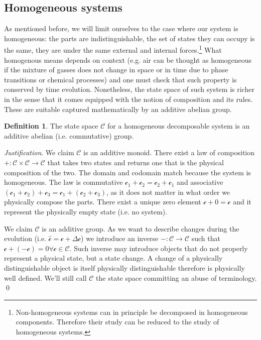 \documentclass[aps,pra,10pt,twocolumn,floatfix,nofootinbib]{revtex4-1}
\theoremstyle{definition}
\newtheorem{defn}[prop]{Definition}
\newenvironment{justification}{\emph{Justification}.}{\qed}
\begin{document}
\subsection{Homogeneous systems}
As mentioned before, we will limit ourselves to the case where our system is homogeneous: the parts are indistinguishable, the set of states they can occupy is the same, they are under the same external and internal forces.\footnote{Non-homogeneous systems can in principle be decomposed in homogeneous components. Therefore their study can be reduced to the study of homogeneous systems.} What homogenous means depends on context (e.g. air can be thought as homogeneous if the mixture of gasses does not change in space or in time due to phase transitions or chemical processes) and one must check that such property is conserved by time evolution. Nonetheless, the state space of such system is richer in the sense that it comes equipped with the notion of composition and its rules. These are suitable captured mathematically by an additive abelian group.

\begin{defn}\label{reducible_state_space}
The state space $\mathcal{C}$ for a homogeneous decomposable system is an additive abelian (i.e. commutative) group.
\end{defn}

\begin{justification}
We claim $\mathcal{C}$ is an additive monoid. There exist a law of composition $+ : \mathcal{C} \times \mathcal{C} \rightarrow \mathcal{C}$ that takes two states and returns one that is the physical composition of the two. The domain and codomain match because the system is homogeneous. The law is commutative $\mathcal{c}_1 +\mathcal{c}_2 = \mathcal{c}_2+\mathcal{c}_1$ and associative $(\mathcal{c}_1 + \mathcal{c}_2) + \mathcal{c}_3 = \mathcal{c}_1 + (\mathcal{c}_2 + \mathcal{c}_3)$, as it does not matter in what order we physically compose the parts. There exist a unique zero element $\mathcal{c} + 0 = \mathcal{c}$ and it represent the physically empty state (i.e. no system).

We claim $\mathcal{C}$ is an additive group. As we want to describe changes during the evolution (i.e. $\hat{\mathcal{c}} = \mathcal{c} +\Delta \mathcal{c}$) we introduce an inverse $- : \mathcal{C} \rightarrow \mathcal{C}$ such that $\mathcal{c} + ( - \mathcal{c}) = 0 \forall \mathcal{c} \in \mathcal{C}$. Such inverse may introduce objects that do not properly represent a physical state, but a state change. A change of a physically distinguishable object is itself physically distinguishable therefore is physically well defined. We'll still call $\mathcal{C}$ the state space committing an abuse of terminology.
\end{justification}
\end{document}
